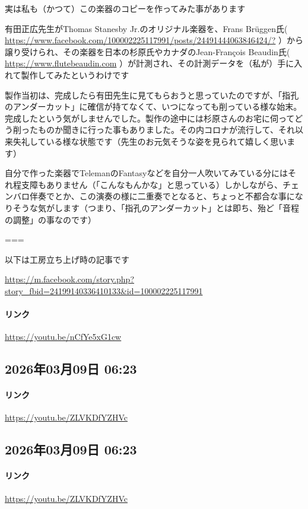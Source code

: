 実は私も（かつて）この楽器のコピーを作ってみた事があります

有田正広先生がThomas Stanesby Jr.のオリジナル楽器を、Frans Brüggen氏( \url{https://www.facebook.com/100002225117991/posts/24491444063846424/?} ）から譲り受けられ、その楽器を日本の杉原氏やカナダのJean-François Beaudin氏( \url{https://www.flutebeaudin.com} ）が計測され、その計測データを（私が）手に入れて製作してみたというわけです

製作当初は、完成したら有田先生に見てもらおうと思っていたのですが、「指孔のアンダーカット」に確信が持てなくて、いつになっても削っている様な始末。完成したという気がしませんでした。製作の途中には杉原さんのお宅に伺ってどう削ったものか聞きに行った事もありました。その内コロナが流行して、それ以来失礼している様な状態です（先生のお元気そうな姿を見られて嬉しく思います）

自分で作った楽器でTelemanのFantasyなどを自分一人吹いてみている分にはそれ程支障もありません（「こんなもんかな」と思っている）しかしながら、チェンバロ伴奏でとか、この演奏の様に二重奏でとなると、ちょっと不都合な事になりそうな気がします（つまり、「指孔のアンダーカット」とは即ち、殆ど「音程の調整」の事なのです）

===

以下は工房立ち上げ時の記事です

\url{https://m.facebook.com/story.php?story_fbid=24199140336410133&id=100002225117991}

\paragraph{リンク}
\url{https://youtu.be/nCfYe5xG1cw}

\subsection*{2026年03月09日 06:23}

\paragraph{リンク}
\url{https://youtu.be/ZLVKDfYZHVc}

\subsection*{2026年03月09日 06:23}

\paragraph{リンク}
\url{https://youtu.be/ZLVKDfYZHVc}

